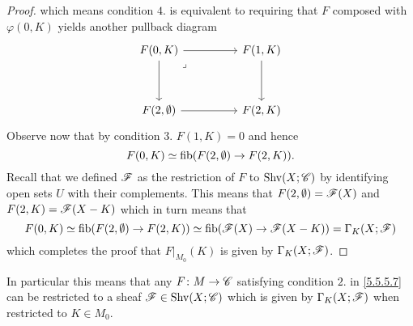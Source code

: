 \documentclass[../../thesis.tex]{subfiles}
\begin{document}
\begin{proof}
    which means condition $4.$ is equivalent to requiring that $F$ composed with $\varphi(0,K)$ yields another pullback diagram
    \[\begin{tikzcd}
            {F(0,K)} && {F(1,K)} \\
            \\
            {F(2,\emptyset)} && {F(2,K)}
            \arrow[from=1-1, to=1-3]
            \arrow[from=1-3, to=3-3]
            \arrow[from=3-1, to=3-3]
            \arrow[from=1-1, to=3-1]
            \arrow["\lrcorner"{anchor=center, pos=0.125}, draw=none, from=1-1, to=3-3]
        \end{tikzcd}\]
    Observe now that by condition $3.$ $F(1,K)=0$ and hence
    \[
        F(0,K)\simeq \operatorname{fib}(F(2,\emptyset) \to F(2,K)).
    \]
    Recall that we defined $\mathscr{F}$ as the restriction of $F$ to $\mathrm{Shv}(X;\mathscr{C})$ by identifying open sets $U$ with their complements.
    This means that $F(2,\emptyset) = \mathscr{F}(X)$ and $F(2,K) = \mathscr{F}(X-K)$ which in turn means that
    \[
        F(0,K)\simeq \operatorname{fib}(F(2,\emptyset) \to F(2,K)) \simeq \operatorname{fib}(\mathscr{F}(X) \to \mathscr{F}(X-K)) = \Gamma_K(X;\mathscr{F})
    \]
    which completes the proof that $F|_{M_0}(K)$ is given by $\Gamma_K(X;\mathscr{F})$.
\end{proof}
\begin{corollary}\label{restrictFcorollary}
    In particular this means that any $F\colon M \to \mathscr{C}$ satisfying condition $2.$ in \ref{5.5.5.7} can be restricted to a sheaf \hspace{0.25em}$\mathscr{F}\in\mathrm{Shv}(X;\mathscr{C})$ which is given by $\Gamma_K(X;\mathscr{F})$ when restricted to $K \in M_0$.
\end{corollary}
\end{document}
